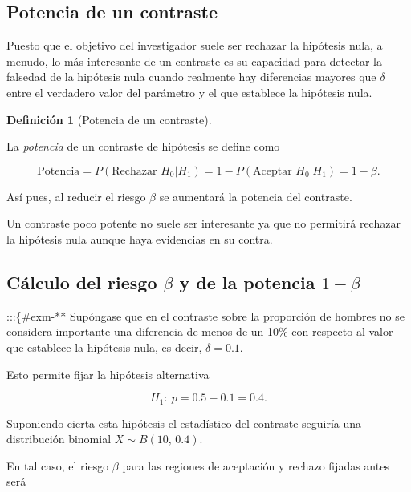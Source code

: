 \documentclass[
  a4paper,
]{scrreport}
\theoremstyle{plain}
\theoremstyle{definition}
\newtheorem{definition}{Definición}[chapter]
\theoremstyle{definition}
\theoremstyle{remark}
\begin{document}
\subsection{Potencia de un contraste}\label{potencia-de-un-contraste}

Puesto que el objetivo del investigador suele ser rechazar la hipótesis
nula, a menudo, lo más interesante de un contraste es su capacidad para
detectar la falsedad de la hipótesis nula cuando realmente hay
diferencias mayores que \(\delta\) entre el verdadero valor del
parámetro y el que establece la hipótesis nula.

\begin{definition}[Potencia de un
contraste]\protect\hypertarget{def-potencia-contraste}{}\label{def-potencia-contraste}

La \emph{potencia} de un contraste de hipótesis se define como

\[
\mbox{Potencia} = P(\mbox{Rechazar }H_0|H_1) = 1 - P(\mbox{Aceptar }H_0|H_1) = 1-\beta.
\]

\end{definition}

Así pues, al reducir el riesgo \(\beta\) se aumentará la potencia del
contraste.

Un contraste poco potente no suele ser interesante ya que no permitirá
rechazar la hipótesis nula aunque haya evidencias en su contra.

\subsection{\texorpdfstring{Cálculo del riesgo \(\beta\) y de la
potencia
\(1-\beta\)}{Cálculo del riesgo \textbackslash beta y de la potencia 1-\textbackslash beta}}\label{cuxe1lculo-del-riesgo-beta-y-de-la-potencia-1-beta}

:::\{\#exm-** Supóngase que en el contraste sobre la proporción de
hombres no se considera importante una diferencia de menos de un 10\%
con respecto al valor que establece la hipótesis nula, es decir,
\(\delta=0.1\).

Esto permite fijar la hipótesis alternativa

\[H_1:\ p=0.5-0.1=0.4.\]

Suponiendo cierta esta hipótesis el estadístico del contraste seguiría
una distribución binomial \(X\sim B(10,\,0.4)\).

En tal caso, el riesgo \(\beta\) para las regiones de aceptación y
rechazo fijadas antes será
\end{document}
